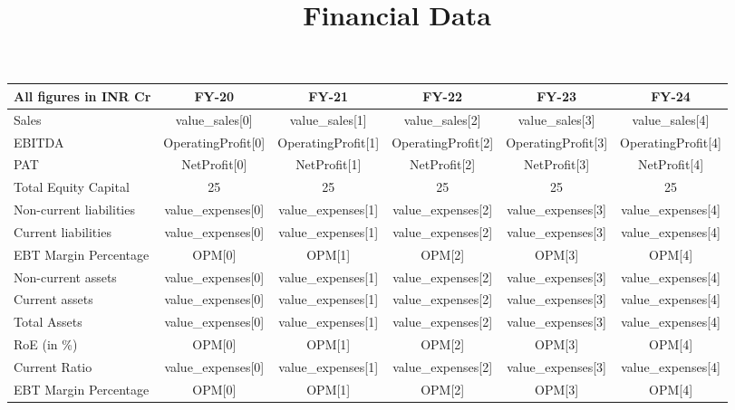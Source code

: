 \documentclass{article}
\title{\textbf{Financial Data}}
\date{}
\begin{document}
\maketitle

\begin{table}[H]
    \centering
    \begin{tabularx}{\textwidth}{|X|c|c|c|c|c|}
        \hline
        \rowcolor{blue!20}
        \textbf{All figures in INR Cr} & \textbf{FY-20} & \textbf{FY-21} & \textbf{FY-22} & \textbf{FY-23} & \textbf{FY-24} \\
        \hline
        Sales & {{ value_sales[0] }} & {{ value_sales[1] }} & {{ value_sales[2] }} & {{ value_sales[3] }} & {{ value_sales[4] }} \\
        \hline
        EBITDA & {{ OperatingProfit[0] }} & {{ OperatingProfit[1] }} & {{ OperatingProfit[2] }} & {{ OperatingProfit[3] }} & {{ OperatingProfit[4] }} \\
        \hline
        PAT & {{ NetProfit[0] }} & {{ NetProfit[1] }} & {{ NetProfit[2] }} & {{ NetProfit[3] }} & {{ NetProfit[4] }} \\
        \hline
        Total Equity Capital & 25 & 25 & 25 & 25 & 25 \\
        \hline
        Non-current liabilities & {{ value_expenses[0] }} & {{ value_expenses[1] }} & {{ value_expenses[2] }} & {{ value_expenses[3] }} & {{ value_expenses[4] }} \\
        \hline
        Current liabilities & {{ value_expenses[0] }} & {{ value_expenses[1] }} & {{ value_expenses[2] }} & {{ value_expenses[3] }} & {{ value_expenses[4] }} \\
        \hline
        EBT Margin Percentage & {{ OPM[0] }} & {{ OPM[1] }} & {{ OPM[2] }} & {{ OPM[3] }} & {{ OPM[4] }} \\
        \hline
        Non-current assets & {{ value_expenses[0] }} & {{ value_expenses[1] }} & {{ value_expenses[2] }} & {{ value_expenses[3] }} & {{ value_expenses[4] }} \\
        \hline
        Current assets & {{ value_expenses[0] }} & {{ value_expenses[1] }} & {{ value_expenses[2] }} & {{ value_expenses[3] }} & {{ value_expenses[4] }} \\
        \hline
        Total Assets & {{ value_expenses[0] }} & {{ value_expenses[1] }} & {{ value_expenses[2] }} & {{ value_expenses[3] }} & {{ value_expenses[4] }} \\
        \hline
        RoE (in \%) & {{ OPM[0] }} & {{ OPM[1] }} & {{ OPM[2] }} & {{ OPM[3] }} & {{ OPM[4] }} \\
        \hline
        Current Ratio & {{ value_expenses[0] }} & {{ value_expenses[1] }} & {{ value_expenses[2] }} & {{ value_expenses[3] }} & {{ value_expenses[4] }} \\
        \hline
        EBT Margin Percentage & {{ OPM[0] }} & {{ OPM[1] }} & {{ OPM[2] }} & {{ OPM[3] }} & {{ OPM[4] }} \\
        \hline
    \end{tabularx}
\end{table}
\end{document}
